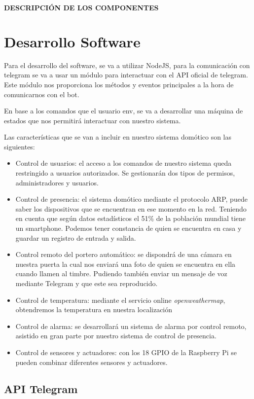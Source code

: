 \documentclass[10pt,journal,compsoc]{IEEEtran}
\begin{document}
\textbf{DESCRIPCIÓN DE LOS COMPONENTES}

\section{Desarrollo Software}
Para el desarrollo del software, se va a utilizar NodeJS, para la comunicación con telegram se va a 
usar un módulo para interactuar con el API oficial de telegram. Este módulo nos proporciona los 
métodos y eventos principales a la hora de comunicarnos con el bot.

En base a los comandos que el usuario env, se va a desarrollar una máquina de estados que nos 
permitirá interactuar con nuestro sistema.

Las características que se van a incluir en nuestro sistema domótico son las siguientes:
\begin{itemize}
\item Control de usuarios: el acceso a los comandos de nuestro sistema queda restringido a 
usuarios autorizados. Se gestionarán dos tipos de permisos, administradores y usuarios.
\item Control de presencia: el sistema domótico mediante el protocolo ARP, puede saber los 
dispositivos que se encuentran en ese momento en la red. Teniendo en cuenta que según datos 
estadísticos el 51\% de la población mundial tiene un smartphone. Podemos tener constancia de 
quien se encuentra en casa y guardar un registro de entrada y salida.
\item Control remoto del portero automático: se dispondrá de una cámara en nuestra puerta la cual 
nos enviará una foto de quien se encuentra en ella cuando llamen al timbre. Pudiendo también enviar 
un mensaje de voz mediante Telegram y que este sea reproducido.
\item Control de temperatura: mediante el servicio online \textit{openweathermap}, obtendremos la 
temperatura en nuestra localización
\item Control de alarma: se desarrollará un sistema de alarma por control remoto, asistido en 
gran parte por nuestro sistema de control de presencia.
\item Control de sensores y actuadores: con los 18 GPIO de la Raspberry Pi se pueden combinar 
diferentes sensores y actuadores.
\end{itemize}

\subsection{API Telegram}
\end{document}

